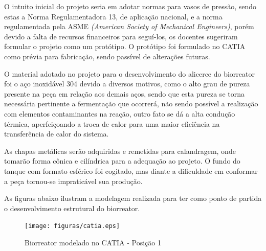 O intuito inicial do projeto seria em adotar normas para vasos de pressão, sendo estas a Norma Regulamentadora 13, de aplicação nacional, e a norma regulamentada pela ASME \textit{(American Society of Mechanical Engineers)}, porém devido a falta de recursos financeiros para seguí-los, os docentes sugeriram formular o projeto como um protótipo. O protótipo foi formulado no CATIA como prévia para fabricação, sendo passível de alterações futuras.

O material adotado no projeto para o desenvolvimento do alicerce do biorreator foi o aço inoxidável 304 devido a diversos motivos, como o alto grau de pureza presente na peça em relação aos demais aços, sendo que esta pureza se torna necessária pertinente a fermentação que ocorrerá, não sendo possível a realização com elementos contaminantes na reação, outro fato se dá a alta condução térmica, aperfeiçoando a troca de calor para uma maior eficiência na transferência de calor do sistema.

As chapas metálicas serão adquiridas e remetidas para calandragem, onde tomarão forma cônica e cilíndrica para a adequação  ao projeto. O fundo do tanque com formato esférico foi cogitado, mas diante a dificuldade em conformar a peça tornou-se impraticável sua produção.

As figuras abaixo ilustram a modelagem realizada para ter como ponto de partida o desenvolvimento estrutural do biorreator.

\begin{figure}[h]
	\centering
	\texttt{[image: figuras/catia.eps]}
	\caption{Biorreator modelado no CATIA - Posição 1}
	\label{catia}
\end{figure}

